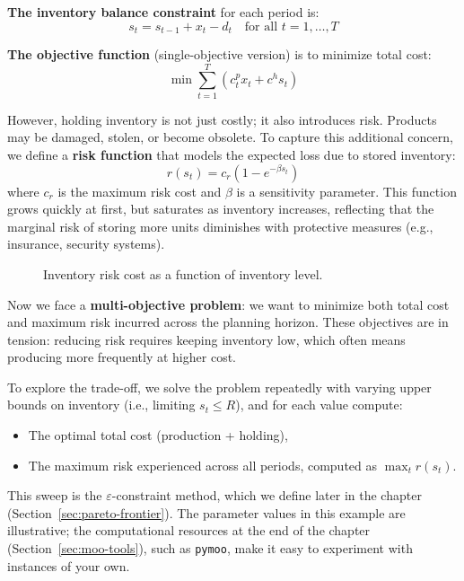 \textbf{The inventory balance constraint} for each period is:
\[
s_t = s_{t-1} + x_t - d_t \quad \text{for all } t = 1,\ldots,T
\]

\textbf{The objective function} (single-objective version) is to minimize total cost:
\[
\min \sum_{t=1}^{T} \left( c^p_t x_t + c^h s_t \right)
\]

However, holding inventory is not just costly; it also introduces risk. Products may be damaged, stolen, or become obsolete. To capture this additional concern, we define a \textbf{risk function} that models the expected loss due to stored inventory:
\[
r(s_t) = c_r \left(1 - e^{-\beta s_t}\right)
\]
where \(c_r\) is the maximum risk cost and \(\beta\) is a sensitivity parameter. This function grows quickly at first, but saturates as inventory increases, reflecting that the marginal risk of storing more units diminishes with protective measures (e.g., insurance, security systems).

\begin{figure}[h]
    \centering
    \caption{Inventory risk cost as a function of inventory level.}
\end{figure}

Now we face a \textbf{multi-objective problem}: we want to minimize both total cost and maximum risk incurred across the planning horizon. These objectives are in tension: reducing risk requires keeping inventory low, which often means producing more frequently at higher cost.

To explore the trade-off, we solve the problem repeatedly with varying upper bounds on inventory (i.e., limiting \(s_t \leq R\)), and for each value compute:
\begin{itemize}
    \item The optimal total cost (production + holding),
    \item The maximum risk experienced across all periods, computed as \( \max_t r(s_t) \).
\end{itemize}

This sweep is the $\varepsilon$-constraint method, which we define later in the chapter (Section~\ref{sec:pareto-frontier}). The parameter values in this example are illustrative; the computational resources at the end of the chapter (Section~\ref{sec:moo-tools}), such as \texttt{pymoo}, make it easy to experiment with instances of your own.

